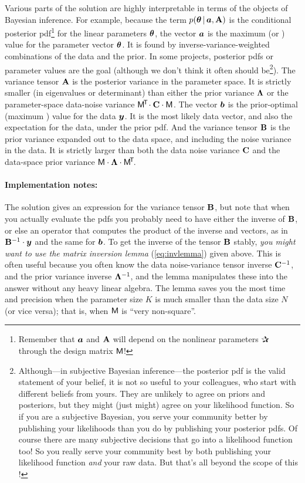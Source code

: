 Various parts of the solution are highly interpretable in terms of the
objects of Bayesian inference. For example, because the term $p(\boldsymbol{\theta}\,|\,
\boldsymbol{a},\mathbf{A})$ is the conditional posterior pdf\footnote{Remember that $\boldsymbol{a}$ and
$\mathbf{A}$ will depend on the nonlinear parameters $\bP$ through the design matrix
$\mathsf{M}$!} for the linear parameters $\boldsymbol{\theta}$, the vector $\boldsymbol{a}$ is the maximum
 (or ) value for the parameter vector
$\boldsymbol{\theta}$.
It is found by inverse-variance-weighted combinations of the data and the prior.
In some projects, posterior pdfs or  parameter values are the goal
(although we don't think it often should be\footnote{Although---in subjective
  Bayesian inference---the posterior pdf
  is the valid statement of your belief, it is not so useful to your colleagues,
  who start with different beliefs from yours. They are unlikely to agree on
  priors and posteriors, but they might (just might) agree on your likelihood
  function. So if you are a subjective Bayesian, you serve your community better
  by publishing your likelihoods than you do by publishing your posterior pdfs.
  Of course there are many subjective decisions that go into a likelihood function
  too! So you really serve your community best by both publishing your likelihood
  function \emph{and} your raw data. But that's all beyond the scope of this
  \documentname!}).
The variance tensor $\mathbf{A}$ is the posterior variance in the parameter space.
It is strictly smaller (in eigenvalues or determinant) than either
the prior variance $\mathbf{\Lambda}$ or the parameter-space data-noise
variance $\mathsf{M}^{\!\mathsf{T}\!}\cdot\mathbf{C}\cdot\mathsf{M}$.
The vector $\boldsymbol{b}$ is the prior-optimal (maximum )
value for the data $\boldsymbol{y}$.
It is the most likely data vector, and also the expectation for the data,
under the prior pdf.
And the variance tensor $\mathbf{B}$ is the prior variance expanded out to the
data space, and including the noise variance in the data.
It is strictly larger than both the data noise variance $\mathbf{C}$ and the
data-space prior variance $\mathsf{M}\cdot\mathbf{\Lambda}\cdot\mathsf{M}^{\!\mathsf{T}\!}$.


\paragraph{Implementation notes:}
The solution gives an expression for the variance tensor $\mathbf{B}$, but
note that when you actually evaluate the pdfs you probably need to
have either the inverse of $\mathbf{B}$, or else an operator that computes
the product of the inverse and vectors, as in $\mathbf{B}^{-1}\cdot\boldsymbol{y}$ and
the same for $\boldsymbol{b}$.
To get the inverse of the tensor $\mathbf{B}$ stably, \emph{you might want to use
the matrix inversion lemma} (\ref{eq:invlemma}) given above.
This is often useful because you often know the data noise-variance
tensor inverse $\mathbf{C}^{-1}$, and the prior variance inverse
$\mathbf{\Lambda}^{-1}$, and the lemma manipulates these into the answer without
any heavy linear algebra.
The lemma saves you the most time and precision when the parameter size $K$
is much smaller than the data size $N$ (or vice versa); that is, when $\mathsf{M}$
is ``very non-square''.

